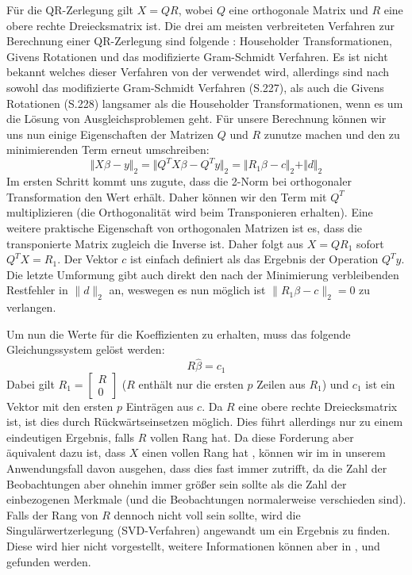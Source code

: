 Für die QR-Zerlegung gilt $X = QR$, wobei $Q$ eine orthogonale Matrix und $R$ eine obere rechte Dreiecksmatrix ist.
Die drei am meisten verbreiteten Verfahren zur Berechnung einer QR-Zerlegung sind folgende \citep[S. 211ff]{Golub1989}: Householder Transformationen, Givens Rotationen und das modifizierte Gram-Schmidt Verfahren.
Es ist nicht bekannt welches dieser Verfahren von der \naglib verwendet wird, allerdings sind nach \cite{Golub1989} sowohl das modifizierte Gram-Schmidt Verfahren (S.227), als auch die Givens Rotationen (S.228) langsamer als die Householder Transformationen, wenn es um die Lösung von Ausgleichsproblemen geht.
Für unsere Berechnung können wir uns nun einige Eigenschaften der Matrizen $Q$ und $R$ zunutze machen und den zu minimierenden Term erneut umschreiben:
\begin{equation*}
  \label{eq:orthogonal_transformation}
  \Vert X\beta - y \Vert_2 = \Vert Q^T X \beta - Q^T y \Vert_2 = \Vert R_1 \beta - c \Vert_2 + \Vert d \Vert_2
\end{equation*}
Im ersten Schritt kommt uns zugute, dass die 2-Norm bei orthogonaler Transformation den Wert erhält.
Daher können wir den Term mit $Q^T$ multiplizieren (die Orthogonalität wird beim Transponieren erhalten).
Eine weitere praktische Eigenschaft von orthogonalen Matrizen ist es, dass die transponierte Matrix zugleich die Inverse ist.
Daher folgt aus $X = QR_1$ sofort $Q^T X = R_1$.
Der Vektor $c$ ist einfach definiert als das Ergebnis der Operation $Q^T y$.
Die letzte Umformung gibt auch direkt den nach der Minimierung verbleibenden Restfehler in $\|d\|_2$ an, weswegen es nun möglich ist $\|R_1\beta - c\|_2 = 0$ zu verlangen.

Um nun die Werte für die Koeffizienten zu erhalten, muss das folgende Gleichungssystem gelöst werden:
\begin{equation*}
  R\hat\beta = c_1
\end{equation*}
Dabei gilt $R_1 = \begin{bmatrix} R \\ 0\end{bmatrix}$ ($R$ enthält nur die ersten $p$ Zeilen aus $R_1$) und $c_1$ ist ein Vektor mit den ersten $p$ Einträgen aus $c$. 
Da $R$ eine obere rechte Dreiecksmatrix ist, ist dies durch Rückwärtseinsetzen möglich.
Dies führt allerdings nur zu einem eindeutigen Ergebnis, falls $R$ vollen Rang hat.
Da diese Forderung aber äquivalent dazu ist, dass $X$ einen vollen Rang hat \citep[S. 225]{Golub1989}, können wir im in unserem Anwendungsfall davon ausgehen, dass dies fast immer zutrifft, da die Zahl der Beobachtungen aber ohnehin immer größer sein sollte als die Zahl der einbezogenen Merkmale (und die Beobachtungen normalerweise verschieden sind).
Falls der Rang von $R$ dennoch nicht voll sein sollte, wird die Singulärwertzerlegung (SVD-Verfahren) angewandt um ein Ergebnis zu finden. 
Diese wird hier nicht vorgestellt, weitere Informationen können aber in \cite{wikipedia:svd}, \cite{nag:g02dac} und \citep[S. 239f]{Golub1989} gefunden werden.

